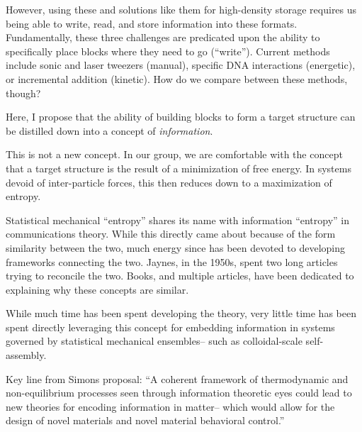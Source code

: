 However, using these and solutions like them for high-density storage requires us being able to write, read, and store information into these formats.
Fundamentally, these three challenges are predicated upon the ability to specifically place blocks where they need to go (``write'').
Current methods include sonic and laser tweezers (manual), specific DNA interactions (energetic), or incremental addition (kinetic).
How do we compare between these methods, though?

Here, I propose that the ability of building blocks to form a target structure can be distilled down into a concept of \textit{information}.

This is not a new concept.
In our group, we are comfortable with the concept that a target structure is the result of a minimization of free energy.
In systems devoid of inter-particle forces, this then reduces down to a maximization of entropy.

Statistical mechanical ``entropy'' shares its name with information ``entropy'' in communications theory.
While this directly came about because of the form similarity between the two, much energy since has been devoted to developing frameworks connecting the two.
Jaynes, in the 1950s, spent two long articles trying to reconcile the two. 
Books, and multiple articles, have been dedicated to explaining why these concepts are similar.

While much time has been spent developing the theory, very little time has been spent directly leveraging this concept for embedding information in systems governed by statistical mechanical ensembles-- such as colloidal-scale self-assembly.

Key line from Simons proposal: ``A coherent framework of thermodynamic and non-equilibrium processes seen through information theoretic eyes could lead to new theories for encoding information in matter-- which would allow for the design of novel materials and novel material behavioral control.''


